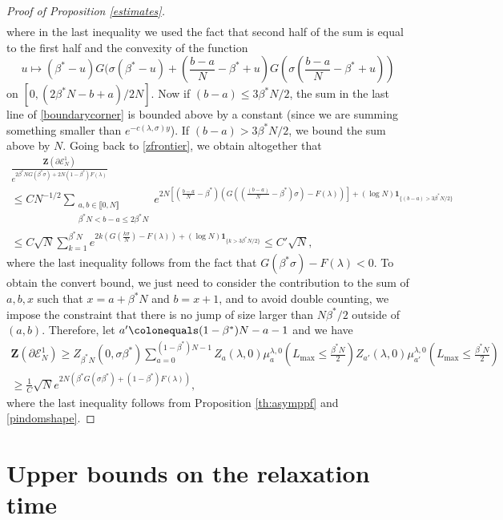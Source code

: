 \documentclass[reqno,11pt]{amsart}
\numberwithin{equation}{section}
\newcommand{\gb}{\beta}
\newcommand{\gl}{\lambda}
\newcommand{\gs}{\sigma}
\newcommand{\cE}{{\ensuremath{\mathcal E}} }
\newcommand{\bZ}{{\ensuremath{\mathbf Z}} }
\newcommand{\ind}{\mathbf{1}}
\newcommand{\lint}{\llbracket}
\newcommand{\rint}{\rrbracket}
\newcommand{\red}{\color{darkred}}
\newcommand{\sumtwo}[2]{\sum_{\substack{#1 \\ #2}}} %
\begin{document}
\begin{proof}[Proof of Proposition \ref{estimates}]
\begin{multline}
\end{multline}
where in the last inequality we used the fact that second half of the sum is equal to the first half and the convexity of the function $$u \mapsto (\beta^*- u) G( \sigma(\beta^*- u)+\left(\frac{b-a}{N}-\beta^*+u\right)G\left(\sigma\left(\frac{b-a}{N}-\beta^*+u\right)\right) $$ on $[0,(2\beta^*N-b+a)/2N]$.
Now if {\red $(b-a)\le 3\beta^*N/2$}, the sum in the last line of \eqref{boundarycorner} 
is bounded above by a constant (since we are summing something smaller than $e^{-c(\gl,\sigma)y}$). If $(b-a)> 3\beta^*N/2$, we bound the sum above by $N$.
Going back to \eqref{zfrontier}, we obtain altogether that
\begin{multline}
  \frac{ \bZ(\partial \cE^1_N)}{e^{ 2\gb^*N G(\gb^* \gs)+2N(1-\gb^*) F(\gl)}}\\
  \le C N^{-1/2} \sumtwo{a,b\in \lint 0,N\rint} {\beta^* N<b-a \le 2\beta^*N}
   e^{2N\left[ \left( \frac{b-a}{N}-\beta^*\right) \left( G\left( \left(\frac{(b-a)}{N}-\gb^*\right) \gs\right)-F(\gl)\right) \right]+ (\log N) \ind_{\{ (b-a)> 3\beta^*N/2\}}}\\
   \le C \sqrt{N}\sum_{k=1}^{\beta^*N} e^{2 k \left( G\left(\frac{k\sigma}{N}\right)-F(\gl)\right) + (\log N) \ind_{\{ k> 3\beta^*N/2\}}}
   \le C' \sqrt{N},
   \end{multline}
where the last inequality follows from the fact that $G\left(\beta^* \gs\right)-F(\gl)<0$.
To obtain the convert bound, we just need to consider the contribution to the sum of $a,b,x$ such that 
$x=a+\beta^*N$ and $b=x+1$, and to avoid double counting,  we impose the constraint that there is no jump of size larger than $N\beta^*/2$ outside of $(a,b)$.
 Therefore, let $a' \colonequals (1-\gb^*)N-a-1 $ and we have
\begin{multline}
\bZ(\partial \cE_N^1) \ge Z_{\gb^*N}(0, \gs \gb^*) \sum_{a =0}^{ (1-\gb^*)N-1} Z_a(\gl, 0) \mu_a^{\gl, 0}\left(L_{\max} \le \tfrac{ \gb^*N}{2} \right) 
   Z_{a'}(\gl, 0) \mu_{a'}^{\gl, 0}\left(L_{\max} \le \tfrac{\gb^*N}{2} \right)\\
 \ge \frac{1}{C} \sqrt{N} e^{2N\left(\gb^*  G(\gs \gb^*)+ (1-\gb^*)F(\gl)\right)},
\end{multline}
where the last inequality follows from Proposition \ref{th:asymppf} and \eqref{pindomshape}.



\end{proof}



\section{Upper bounds on the relaxation time} \label{sec:upbrel}
\end{document}
